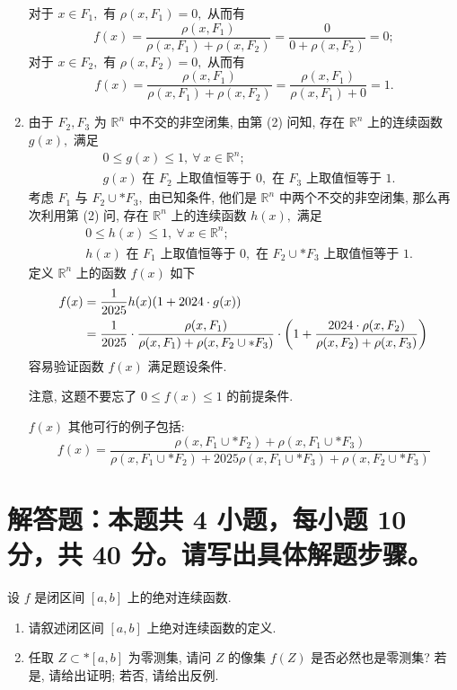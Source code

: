 \begin{solution}
\begin{enumerate}
对于 $x \in F_1,$ 有 $\rho(x, F_1) = 0,$ 从而有
$$f(x) = \dfrac{\rho(x, F_1)}{\rho(x, F_1) + \rho(x, F_2)} = \dfrac{0}{0 + \rho(x, F_2)} = 0;$$
对于 $x \in F_2,$ 有 $\rho(x, F_2) = 0,$ 从而有
$$f(x) = \dfrac{\rho(x, F_1)}{\rho(x, F_1) + \rho(x, F_2)} = \dfrac{\rho(x, F_1)}{\rho(x, F_1) + 0} = 1.$$
\item 由于 $F_2, F_3$ 为 $\mathbb{R}^n$ 中不交的非空闭集, 由第 (2) 问知, 存在 $\mathbb{R}^n$ 上的连续函数 $g(x),$ 满足
\begin{align*}
& 0 \leqslant g(x) \leqslant 1, ~ \forall ~ x \in \mathbb{R}^n; \\
& \text{$g(x)$ 在 $F_2$ 上取值恒等于 $0,$ 在 $F_3$ 上取值恒等于 $1.$}
\end{align*}
考虑 $F_1$ 与 $F_2 \cup* F_3,$ 由已知条件, 他们是 $\mathbb{R}^n$ 中两个不交的非空闭集, 那么再次利用第 (2) 问, 存在 $\mathbb{R}^n$ 上的连续函数 $h(x),$ 满足
\begin{align*}
& 0 \leqslant h(x) \leqslant 1, ~ \forall ~ x \in \mathbb{R}^n; \\
& \text{$h(x)$ 在 $F_1$ 上取值恒等于 $0,$ 在 $F_2 \cup* F_3$ 上取值恒等于 $1.$}
\end{align*}
定义 $\mathbb{R}^n$ 上的函数 $f(x)$ 如下
\begin{align*}
f(x) & = \dfrac{1}{2025} h(x) (1 + 2024 \cdot g(x)) \score{5} \\
& = \dfrac{1}{2025} \cdot \dfrac{\rho(x, F_1)}{\rho(x, F_1) + \rho(x, F_2 \cup* F_3)} \cdot \left( 1 + \dfrac{2024 \cdot \rho(x, F_2)}{\rho(x, F_2) + \rho(x, F_3)} \right)
\end{align*}
容易验证函数 $f(x)$ 满足题设条件.

注意, 这题不要忘了 $0 \leqslant f(x) \leqslant 1$ 的前提条件.

$f(x)$ 其他可行的例子包括:
\begin{equation*}
f(x) = \dfrac{\rho(x, F_1\cup* F_2) + \rho(x, F_1\cup* F_3)}{\rho(x, F_1\cup* F_2) + 2025 \rho(x, F_1\cup* F_3) + \rho(x, F_2\cup* F_3)}
\end{equation*}
\end{enumerate}
\end{solution}


\section{解答题：本题共 4 小题，每小题 10 分，共 40 分。请写出具体解题步骤。}


\begin{question}[points = 10]设 $f$ 是闭区间 $[a, b]$ 上的绝对连续函数.
\begin{enumerate}
\item 请叙述闭区间 $[a, b]$ 上绝对连续函数的定义.
\item 任取 $Z \subset* [a, b]$ 为零测集, 请问 $Z$ 的像集 $f(Z)$ 是否必然也是零测集? 若是, 请给出证明; 若否, 请给出反例.
\end{enumerate}

\end{question}

